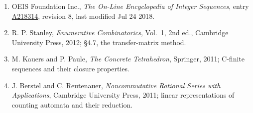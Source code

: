 \documentclass[11pt]{article}
\theoremstyle{definition}
\begin{document}
\begin{enumerate}

\item OEIS Foundation Inc., \emph{The On-Line Encyclopedia of Integer Sequences}, entry \href{https://oeis.org/A218314}{A218314}, revision 8, last modified Jul 24 2018.

\item R. P. Stanley, \emph{Enumerative Combinatorics}, Vol.~1, 2nd ed., Cambridge University Press, 2012; \S4.7, the transfer-matrix method.

\item M. Kauers and P. Paule, \emph{The Concrete Tetrahedron}, Springer, 2011; C-finite sequences and their closure properties.

\item J. Berstel and C. Reutenauer, \emph{Noncommutative Rational Series with Applications}, Cambridge University Press, 2011; linear representations of counting automata and their reduction.

\end{enumerate}
\end{document}
